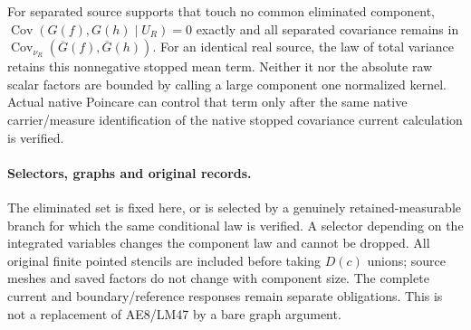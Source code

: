 \documentclass[11pt]{article}
\newcommand{\Cov}{\operatorname{Cov}}
\begin{document}
For separated source supports that touch no common eliminated component,
$\Cov(G(f),G(h)\mid U_R)=0$ exactly and all separated covariance remains in
$\Cov_{\nu_R}(\overline G(f),\overline G(h))$.
For an identical real source, the law of total variance retains this nonnegative stopped
mean term. Neither it nor the absolute raw scalar factors are bounded by calling a large
component one normalized kernel. Actual native Poincare can control that term only after
the same native carrier/measure identification of the native stopped covariance current calculation is verified.

\paragraph{Selectors, graphs and original records.}
The eliminated set is fixed here, or is selected by a genuinely retained-measurable branch
for which the same conditional law is verified. A selector depending on the integrated
variables changes the component law and cannot be dropped. All original finite pointed
stencils are included before taking $D(c)$ unions; source meshes and saved factors do not
change with component size. The complete current and boundary/reference responses remain
separate obligations. This is not a replacement of AE8/LM47 by a bare graph argument.
\end{document}
